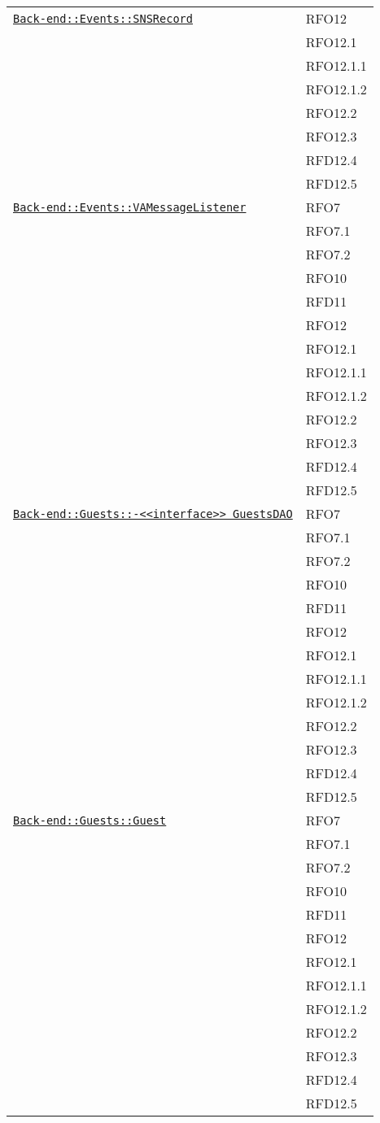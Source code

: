 \begin{longtable}{|>{\centering}m{10cm}|m{3cm}<{\centering}|}
\hyperref[Back-end::Events::SNSRecord]{\texttt{Back-end::Events::SNSRecord}} & RFO12\\
& RFO12.1\\
& RFO12.1.1\\
& RFO12.1.2\\
& RFO12.2\\
& RFO12.3\\
& RFD12.4\\
& RFD12.5\\ \hline

\hyperref[Back-end::Events::VAMessageListener]{\texttt{Back-end::Events::VAMessageListener}} & RFO7\\
& RFO7.1\\
& RFO7.2\\
& RFO10\\
& RFD11\\
& RFO12\\
& RFO12.1\\
& RFO12.1.1\\
& RFO12.1.2\\
& RFO12.2\\
& RFO12.3\\
& RFD12.4\\
& RFD12.5\\ \hline

\hyperref[Back-end::Guests::<<interface>> GuestsDAO]{\texttt{Back-end::Guests::-\linebreak <<interface>> GuestsDAO}} & RFO7\\
& RFO7.1\\
& RFO7.2\\
& RFO10\\
& RFD11\\
& RFO12\\
& RFO12.1\\
& RFO12.1.1\\
& RFO12.1.2\\
& RFO12.2\\
& RFO12.3\\
& RFD12.4\\
& RFD12.5\\ \hline

\hyperref[Back-end::Guests::Guest]{\texttt{Back-end::Guests::Guest}} & RFO7\\
& RFO7.1\\
& RFO7.2\\
& RFO10\\
& RFD11\\
& RFO12\\
& RFO12.1\\
& RFO12.1.1\\
& RFO12.1.2\\
& RFO12.2\\
& RFO12.3\\
& RFD12.4\\
& RFD12.5\\ \hline


\end{longtable}
